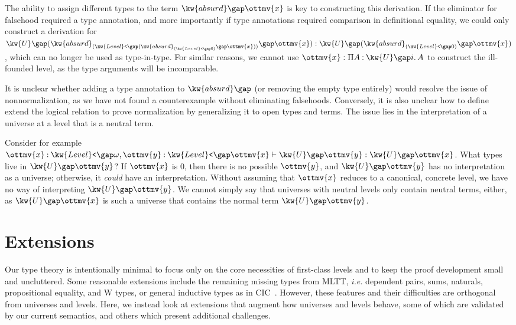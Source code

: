 \documentclass[a4paper,UKenglish,cleveref,autoref,thm-restate]{lipics-v2021}
\makeatletter
\newcommand{\citep}[1]{\cite{#1}}
\newcommand{\ie}{\textit{i.e.}\@\xspace}
\makeatother
\begin{document}
The ability to assign different types to the term $ \kw{absurd} \gap  \ottmv{x} $ is key to constructing this derivation.
If the eliminator for falsehood required a type annotation,
and more importantly if type annotations required comparison in definitional equality,
we could only construct a derivation for
$ \kw{U} \gap   (  \kw{absurd}_{  (  \kw{Level}\texttt{<} \gap   (  \kw{absurd}_{  (  \kw{Level}\texttt{<} \gap   0   )  } \gap  \ottmv{x}  )   )  } \gap  \ottmv{x}  )   :  \kw{U} \gap   (  \kw{absurd}_{  (  \kw{Level}\texttt{<} \gap   0   )  } \gap  \ottmv{x}  )  $,
which can no longer be used as type-in-type.
For similar reasons, we cannot use $\ottmv{x} :  \Pi  A  \mathbin{:}   \kw{U} \gap  i   \mathpunct{.}  A $
to construct the ill-founded level, as the type arguments will be incomparable.

It is unclear whether adding a type annotation to $ \kw{absurd} \gap   \relax  $
(or removing the empty type entirely) would resolve the issue of nonnormalization,
as we have not found a counterexample without eliminating falsehoods.
Conversely, it is also unclear how to define extend the logical relation to prove normalization
by generalizing it to open types and terms.
The issue lies in the interpretation of a universe at a level that is a neutral term.

Consider for example $   \ottmv{x}  \mathbin{:}   \kw{Level}\texttt{<} \gap   \omega    ,  \ottmv{y}  \mathbin{:}   \kw{Level}\texttt{<} \gap  \ottmv{x}    \vdash   \kw{U} \gap  \ottmv{y}   \mathrel{:}   \kw{U} \gap  \ottmv{x}  $.
What types live in $ \kw{U} \gap  \ottmv{y} $?
If $\ottmv{x}$ is $0$, then there is no possible $\ottmv{y}$,
and $ \kw{U} \gap  \ottmv{y} $ has no interpretation as a universe;
otherwise, it \emph{could} have an interpretation.
Without assuming that $\ottmv{x}$ reduces to a canonical, concrete level,
we have no way of interpreting $ \kw{U} \gap  \ottmv{y} $.
We cannot simply say that universes with neutral levels only contain neutral terms, either,
as $ \kw{U} \gap  \ottmv{x} $ is such a universe that contains the normal term $ \kw{U} \gap  \ottmv{y} $.

\section{Extensions} \label{sec:extensions}

Our type theory is intentionally minimal to focus only on the core necessities
of first-class levels and to keep the proof development small and uncluttered.
Some reasonable extensions include the remaining missing types from MLTT,
\ie dependent pairs, sums, naturals, propositional equality, and W types,
or general inductive types as in CIC~\citep{pcuic}.
However, these features and their difficulties are orthogonal from universes and levels.
Here, we instead look at extensions that augment how universes and levels behave,
some of which are validated by our current semantics,
and others which present additional challenges.
\end{document}
